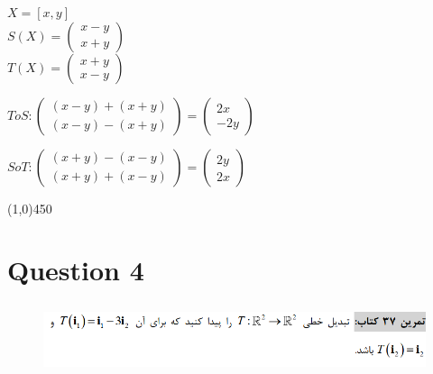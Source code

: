 \documentclass[a4paper,12pt]{article}
\begin{document}
\begin{doublespace}
$X = [  x , y ]$\\
$S(X) = \begin{pmatrix} x-y\\x+y \end{pmatrix}$\\
$T(X) = \begin{pmatrix} x+y\\x-y \end{pmatrix}$\\
\end{doublespace} 

\begin{doublespace}
$ToS : \begin{pmatrix} (x-y)+(x+y)\\ (x-y)-(x+y) \end{pmatrix} = \begin{pmatrix} 2x\\ -2y \end{pmatrix}$
\end{doublespace} 

\begin{doublespace}
$SoT : \begin{pmatrix} (x+y)-(x-y)\\ (x+y)+(x-y) \end{pmatrix} = \begin{pmatrix} 2y\\ 2x \end{pmatrix}$
\end{doublespace} 

\line(1,0){450}
\newpage
\section {Question 4 }
\begin{figure}[h!]
	\centering
	\includegraphics*[height=2cm]{Q4}
\end{figure}
\end{document}
